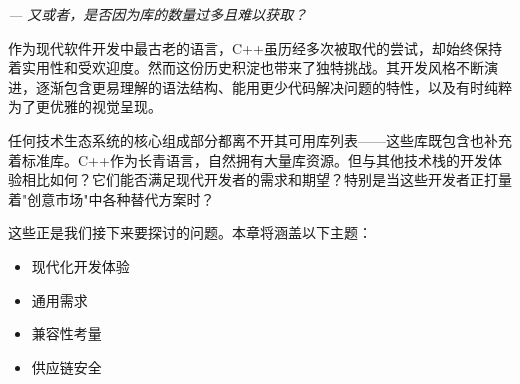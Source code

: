 \begin{flushright}
\textit{--- 又或者，是否因为库的数量过多且难以获取？}
\end{flushright}

作为现代软件开发中最古老的语言，C++虽历经多次被取代的尝试，却始终保持着实用性和受欢迎度。然而这份历史积淀也带来了独特挑战。其开发风格不断演进，逐渐包含更易理解的语法结构、能用更少代码解决问题的特性，以及有时纯粹为了更优雅的视觉呈现。

任何技术生态系统的核心组成部分都离不开其可用库列表——这些库既包含也补充着标准库。C++作为长青语言，自然拥有大量库资源。但与其他技术栈的开发体验相比如何？它们能否满足现代开发者的需求和期望？特别是当这些开发者正打量着"创意市场"中各种替代方案时？

这些正是我们接下来要探讨的问题。本章将涵盖以下主题：

\begin{itemize}
\item 
现代化开发体验

\item 
通用需求

\item 
兼容性考量

\item 
供应链安全
\end{itemize}








